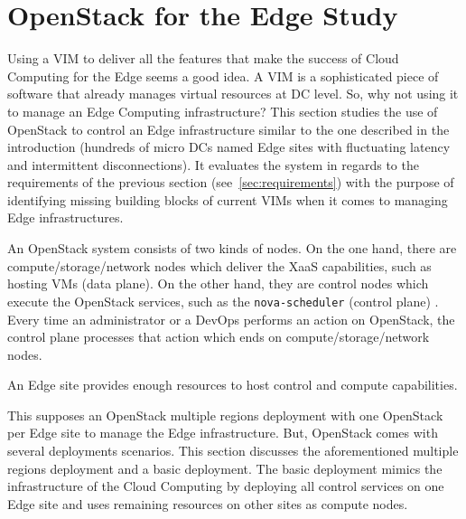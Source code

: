 \section{OpenStack for the Edge Study}
\label{sec:system_design_considerations}
Using a VIM to deliver all the features that make the success of Cloud
Computing for the Edge seems a good idea.
%
%
A VIM is a sophisticated
piece of software that already manages virtual resources at DC level.
So, why not using it to manage an Edge Computing infrastructure? This
section studies the use of OpenStack to control an Edge infrastructure
similar to the one described in the introduction (hundreds of micro
DCs named Edge sites with fluctuating latency and intermittent
disconnections). It evaluates the system in regards to the
requirements of the previous section (see~\ref{sec:requirements}) with
the purpose of identifying missing building blocks of current VIMs
when it comes to managing Edge infrastructures.

An OpenStack system consists of two kinds of nodes. On the one hand,
there are compute/storage/network nodes which deliver the XaaS
capabilities, such as hosting VMs (\ie data plane). On the other hand,
they are control nodes which execute the OpenStack services, such as
the \verb|nova-scheduler| (\ie control plane)
. Every time an
administrator or a DevOps performs an action on OpenStack, the control
plane processes that action which ends on compute/storage/network
nodes.

An Edge site provides enough resources to host control and compute
capabilities.

This supposes an OpenStack multiple regions deployment
with one OpenStack per Edge site to manage the Edge infrastructure.
But, OpenStack comes with several deployments scenarios. This section
discusses the aforementioned multiple regions deployment and a basic
deployment. The basic deployment mimics the infrastructure of the
Cloud Computing by deploying all control services on one Edge site and
uses remaining resources on other sites as compute nodes.

